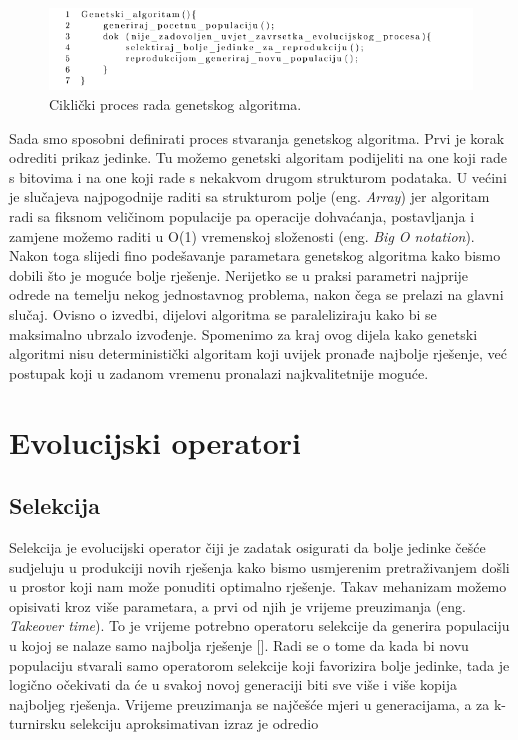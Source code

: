 \documentclass[times, utf8, zavrsni]{fer}
\begin{document}
\begin{figure}[!htb]
	\centering
	\includegraphics[width=15cm]{slike/nenrGenAlg.png}
	\caption{Ciklički proces rada genetskog algoritma. }
	\label{fig:nenr-alg}
\end{figure}


Sada smo sposobni definirati proces stvaranja genetskog algoritma. Prvi je korak odrediti prikaz jedinke. Tu možemo genetski algoritam podijeliti na one koji rade s bitovima i na one koji rade s nekakvom drugom strukturom podataka. U većini je slučajeva najpogodnije raditi sa strukturom polje (eng. \emph{Array}) jer algoritam radi sa fiksnom veličinom populacije pa operacije dohvaćanja, postavljanja i zamjene možemo raditi u O(1) vremenskoj složenosti (eng. \emph{Big O notation}). Nakon toga slijedi fino podešavanje parametara genetskog algoritma kako bismo dobili što je moguće bolje rješenje. Nerijetko se u praksi parametri najprije odrede na temelju nekog jednostavnog problema, nakon čega se prelazi na glavni slučaj. Ovisno o izvedbi, dijelovi algoritma se paraleliziraju kako bi se maksimalno ubrzalo izvođenje. Spomenimo za kraj ovog dijela kako genetski algoritmi nisu deterministički algoritam koji uvijek pronađe najbolje rješenje, već postupak koji u zadanom vremenu pronalazi najkvalitetnije moguće. 

\section{Evolucijski operatori}

\subsection{Selekcija}
\label{selekcija}

Selekcija je evolucijski operator čiji je zadatak osigurati da bolje jedinke češće sudjeluju u produkciji novih rješenja kako bismo usmjerenim pretraživanjem došli u prostor koji nam može ponuditi optimalno rješenje. Takav mehanizam možemo opisivati kroz više parametara, a prvi od njih je vrijeme preuzimanja (eng. \emph{Takeover time}). To je vrijeme potrebno operatoru selekcije da generira populaciju u kojoj se nalaze samo najbolja rješenje [\citet{GoldAndDeb}]. Radi se o tome da kada bi novu populaciju stvarali samo operatorom selekcije koji favorizira bolje jedinke, tada je logično očekivati da će u svakoj novoj generaciji biti sve više i više kopija najboljeg rješenja. Vrijeme preuzimanja se najčešće mjeri u generacijama, a za k-turnirsku selekciju aproksimativan izraz je odredio \citet{EvAlgsinTheoryAndPractise} 
\end{document}
